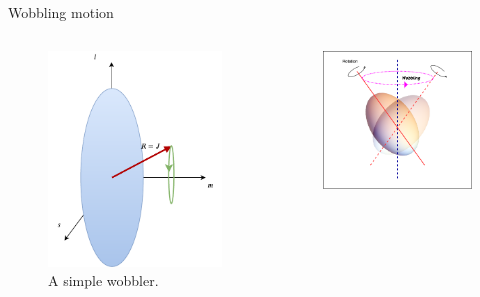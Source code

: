\documentclass{beamer}
\begin{document}
\begin{frame}{Wobbling motion}

\begin{columns}
    \begin{column}{0.4\textwidth}
  \begin{figure}
    \centering
      \includegraphics[scale=0.5]{figs/simpleWobbler.pdf}
      \caption{A simple wobbler.}
  \end{figure}
  \end{column}
  \begin{column}{0.6\textwidth}
        \begin{figure}
          \centering
          \includegraphics[scale=0.35]{figs/wobbling_drawing.png}

\end{figure}
\end{column}
\end{columns}
\end{frame}
\end{document}
